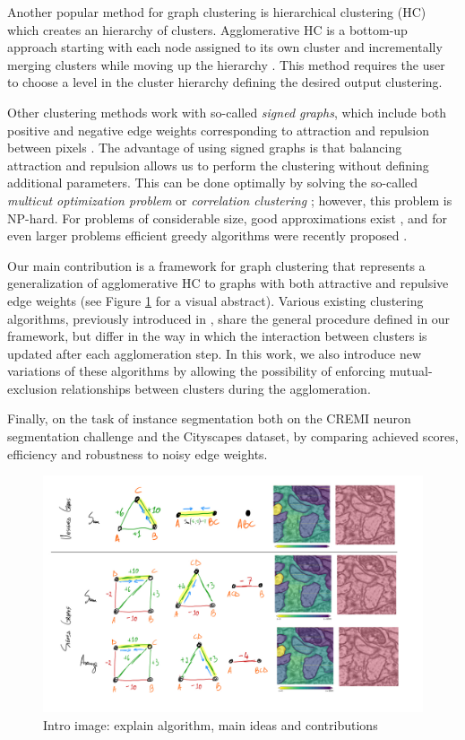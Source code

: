 Another popular method for graph clustering is hierarchical clustering (HC) which creates an hierarchy of clusters. Agglomerative HC is a bottom-up approach starting with each node assigned to its own cluster and incrementally merging clusters while moving up the hierarchy \cite{lance1967general}. This method requires the user to choose a level in the cluster hierarchy defining the desired output clustering. 

Other clustering methods work with so-called \emph{signed graphs}, which include both positive and negative edge weights corresponding to attraction and repulsion between pixels . The advantage of using signed graphs is that balancing attraction and repulsion allows us to perform the clustering without defining additional parameters. This can be done optimally by solving the so-called \emph{multicut optimization problem} or \emph{correlation clustering} \cite{kappes2011globally,chopra1991multiway}; however, this problem is NP-hard. For problems of considerable size, good approximations exist \cite{yarkony2012fast,pape2017solving}, and for even larger problems efficient greedy algorithms were recently proposed \cite{levinkov2017comparative,wolf2018mutex}.

Our main contribution is a framework for graph clustering that represents a generalization of agglomerative HC to graphs with both attractive and repulsive edge weights (see Figure \ref{fig:intro_figure} for a visual abstract). 
Various existing clustering algorithms, previously introduced in \cite{levinkov2017comparative,wolf2018mutex,lance1967general}, share the general procedure defined in our framework, but differ in the way in which the interaction between clusters is updated after each agglomeration step. In this work, we also introduce new variations of these algorithms by allowing the possibility of enforcing mutual-exclusion relationships between clusters during the agglomeration.  

Finally,  on the task of instance segmentation both on the CREMI neuron segmentation challenge and the Cityscapes dataset, by comparing achieved scores, efficiency and robustness to noisy edge weights.  




\begin{figure}[t]
\centering
\includegraphics[width=\textwidth,trim=0.4in 1.2in 0.in 0.05in,clip]{./figs/intro_image.jpg} %
\caption{\small 
Intro image: explain algorithm, main ideas and contributions
\label{fig:intro_figure}}
\end{figure}

